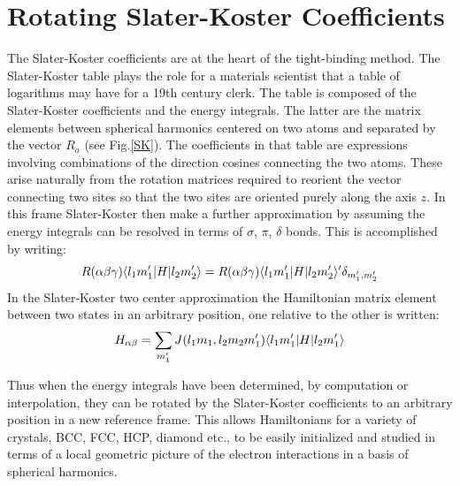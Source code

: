 \section{Rotating Slater-Koster Coefficients}
The Slater-Koster coefficients are at the heart of the tight-binding method.
The Slater-Koster table plays the role for a materials scientist that a table 
of logarithms may have for a 19th century clerk.
The table is composed of the Slater-Koster coefficients 
and the energy integrals. The latter are the matrix
elements between spherical harmonics centered on two atoms and separated
by the vector $R_a$ (see Fig.\ref{SK}). 
The coefficients in that table are expressions involving combinations 
of the direction cosines connecting the two atoms.
These arise naturally from the rotation matrices required 
to reorient the vector connecting two sites so that the two
sites are oriented purely along the axis $z$.
In this frame Slater-Koster then make a further approximation
by assuming the energy integrals can be resolved in terms
of $\sigma$, $\pi$, $\delta$ bonds. This is accomplished by writing:
%
\begin{equation}
R(\alpha\beta\gamma) \langle l_{1}m'_{1}|H|l_{2}m'_{2}\rangle = R(\alpha\beta\gamma)\langle l_{1}m'_{1}|H|l_{2}m'_{2}\rangle' \delta_{m'_1,m'_2}
\end{equation}
%
In the Slater-Koster two center approximation the Hamiltonian matrix 
element between two states in an arbitrary position, one relative to the other is written:
%
\begin{equation}
H_{\alpha\beta}= \sum_{m_{1}'}J(l_{1}m_{1},l_{2}m_{2}m'_{1}) \langle l_{1}m_{1}'|H|l_{2}m_{1}' \rangle
\end{equation}


Thus when the energy integrals have been determined, by computation or interpolation,  
they can be rotated by the Slater-Koster coefficients to an arbitrary position 
in a new reference frame. This allows Hamiltonians for a variety of crystals, 
BCC, FCC, HCP, diamond etc., to be easily initialized and studied in terms of a 
local geometric picture of the electron interactions in a basis of spherical harmonics. 

